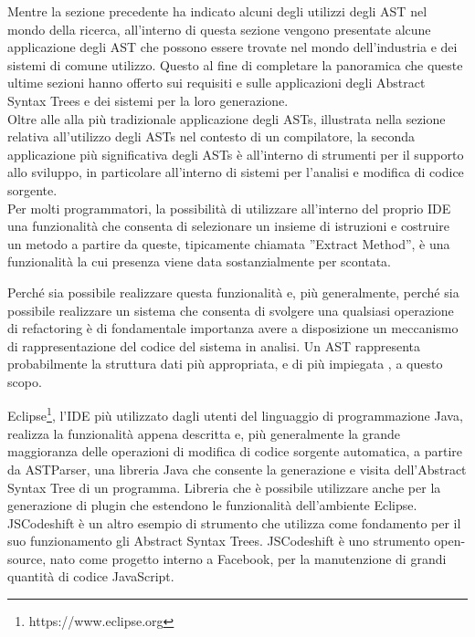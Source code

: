 Mentre la sezione precedente ha indicato alcuni degli utilizzi degli AST nel
mondo della ricerca, all’interno di questa sezione vengono presentate alcune
applicazione degli AST che possono essere trovate nel mondo dell’industria e
dei sistemi di comune utilizzo. Questo al fine di completare la panoramica che
queste ultime sezioni hanno offerto sui requisiti e sulle applicazioni degli
Abstract Syntax Trees e dei sistemi per la loro generazione.\\

Oltre alle alla più tradizionale applicazione degli ASTs, illustrata nella
sezione relativa all’utilizzo degli ASTs nel contesto di un compilatore, la
seconda applicazione più significativa degli ASTs è all’interno di strumenti
per il supporto allo sviluppo, in particolare all’interno di sistemi per
l'analisi e modifica di codice sorgente.\\

Per molti programmatori, la possibilità di utilizzare all’interno del proprio
IDE una funzionalità che consenta di selezionare un insieme di istruzioni e
costruire un metodo a partire da queste, tipicamente chiamata ”Extract Method”,
è una funzionalità la cui presenza viene data sostanzialmente per scontata.

Perché sia possibile realizzare questa funzionalità e, più generalmente, perché
sia possibile realizzare un sistema che consenta di svolgere una qualsiasi
operazione di refactoring è di fondamentale importanza avere a disposizione un
meccanismo di rappresentazione del codice del sistema in analisi. Un AST
rappresenta probabilmente la struttura dati più appropriata, e di più impiegata
\cite{eclipse2006} \cite{netbeans2007}, a questo scopo.

Eclipse\footnote{https://www.eclipse.org}, l’IDE più utilizzato dagli utenti
del linguaggio di programmazione Java, realizza la funzionalità appena
descritta e, più generalmente la grande maggioranza delle operazioni di
modifica di codice sorgente automatica, a partire da ASTParser, una libreria
Java che consente la generazione e visita dell’Abstract Syntax Tree di un
programma. Libreria che è possibile utilizzare anche per la generazione di
plugin che estendono le funzionalità dell’ambiente Eclipse.\\

JSCodeshift \cite{jscodeshift2016} è un altro esempio di strumento che utilizza
come fondamento per il suo funzionamento gli Abstract Syntax Trees. JSCodeshift
è uno strumento open-source, nato come progetto interno a Facebook\texttrademark,
per la manutenzione di grandi quantità di codice JavaScript.

